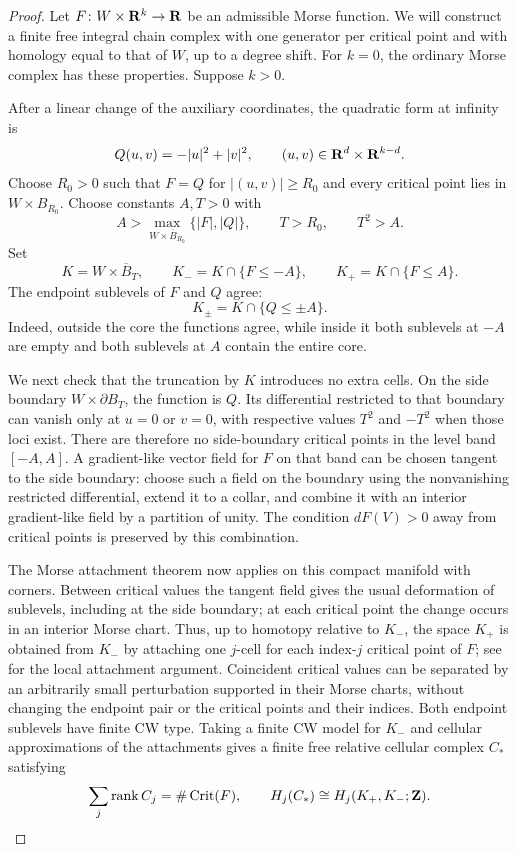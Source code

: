 \begin{proof}
Let $F\colon W\times\mathbf R^k\to\mathbf R$ be an admissible Morse function.
We will construct a finite free integral chain complex with one
generator per critical point and with homology equal to that of $W$,
up to a degree shift.  For $k=0$, the ordinary Morse complex has these
properties.  Suppose $k>0$.

After a linear change of the auxiliary coordinates, the quadratic form
at infinity is
\[
 Q(u,v)=-|u|^2+|v|^2,
 \qquad (u,v)\in\mathbf R^d\times\mathbf R^{k-d}.
\]
Choose $R_0>0$ such that $F=Q$ for $|(u,v)|\geq R_0$ and every
critical point lies in $W\times B_{R_0}$.  Choose constants $A,T>0$ with
\[
 A>\max_{W\times\overline B_{R_0}}\{|F|,|Q|\},
 \qquad T>R_0,\qquad T^2>A.
\]
Set
\[
 K=W\times\overline B_T,\qquad
 K_-=K\cap\{F\leq-A\},\qquad
 K_+=K\cap\{F\leq A\}.
\]
The endpoint sublevels of $F$ and $Q$ agree:
\begin{equation}\label{morse:endpoint-pair}
 K_\pm=K\cap\{Q\leq\pm A\}.
\end{equation}
Indeed, outside the core the functions agree, while inside it both
sublevels at $-A$ are empty and both sublevels at $A$ contain the entire
core.

We next check that the truncation by $K$ introduces no extra cells.
On the side boundary $W\times\partial B_T$, the function is $Q$.
Its differential restricted to that boundary can vanish only at $u=0$
or $v=0$, with respective values $T^2$ and $-T^2$ when those loci
exist.  There are therefore no side-boundary critical points in the
level band $[-A,A]$.  A gradient-like vector field for $F$ on that
band can be chosen tangent to the side boundary: choose such a field
on the boundary using the nonvanishing restricted differential, extend
it to a collar, and combine it with an interior gradient-like field
by a partition of unity.  The condition $dF(V)>0$ away from critical
points is preserved by this combination.

The Morse attachment theorem now applies on this compact manifold with
corners.  Between critical values the tangent field gives the usual
deformation of sublevels, including at the side boundary; at each
critical point the change occurs in an interior Morse chart.
Thus, up to homotopy relative to $K_-$, the space $K_+$ is obtained
from $K_-$ by attaching one $j$-cell for each index-$j$ critical point
of $F$; see
\cite[Section~3]{Milnor1963} for the local attachment argument.
Coincident critical values can be separated by an arbitrarily small
perturbation supported in their Morse charts, without changing the
endpoint pair or the critical points and their indices.
Both endpoint sublevels have finite CW type.  Taking a finite CW model
for $K_-$ and cellular approximations of the attachments gives a finite
free relative cellular complex $C_*$ satisfying
\begin{equation}\label{morse:critical-complex}
 \sum_j\operatorname{rank}C_j=\#\operatorname{Crit}(F),
 \qquad H_j(C_*)\cong H_j(K_+,K_-;\mathbf Z).
\end{equation}


\end{proof}
